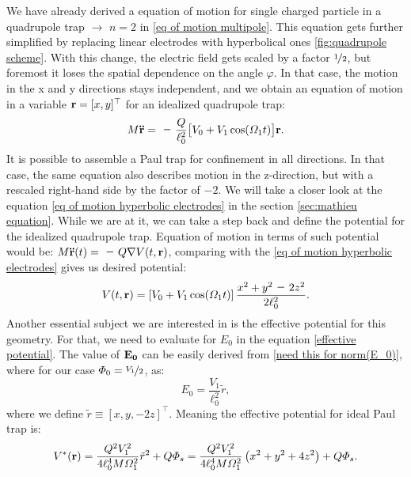 \label{sec:quadrupole trap}
We have already derived a equation of motion for single charged particle in a quadrupole trap $\rightarrow$ $n=2$ in \eqref{eq of motion multipole}. This equation gets further simplified by replacing linear electrodes with hyperbolical ones \ref{fig:quadrupole scheme}. With this change, the electric field gets scaled \cite{leefer2017investigation} by a factor $\nicefrac{1}{2}$, but foremost it loses the spatial dependence on the angle $\varphi$. In that case, the motion in the x and y directions stays independent, and we obtain an equation of motion in a variable $\vb{r} = [x,y]^\top$ for an idealized quadrupole trap:
\begin{equation}
	\label{eq of motion hyperbolic electrodes}
	M\vb{\ddot{r}} = \minus\dfrac{Q}{\ell_0^2} \big[V_0 + V_1 \cos(\Omega_1 t)\big] \vb{r}.
\end{equation}
It is possible to assemble a Paul trap for confinement in all directions. In that case, the same equation also describes motion in the z-direction, but with a rescaled right-hand side by the factor of $\minus 2$. We will take a closer look at the equation \eqref{eq of motion hyperbolic electrodes} in the section \ref{sec:mathieu equation}. While we are at it, we can take a step back and define the potential for the idealized quadrupole trap. Equation of motion in terms of such potential would be: $M\vb{\ddot{r}}(t) = \minus Q\nabla V(t,\vb{r})$, comparing with the \eqref{eq of motion hyperbolic electrodes} gives us desired potential:
\begin{equation}
	\label{ideal quadrupole potential}
	V(t,\vb{r}) = \left[V_0 + V_1 \cos(\Omega_1 t)\right] \dfrac{x^2+y^2 \minus 2z^2}{2\ell_0^2}.
\end{equation}
Another essential subject we are interested in is the effective potential for this geometry. For that, we need to evaluate for $E_0$ in the equation \eqref{effective potential}. The value of $\vb{E_0}$ can be easily derived from \eqref{need this for norm(E_0)}, where for our case $\Phi_0 = \nicefrac{V_1}{2}$, as:
\begin{equation}
	\label{norm(E_0)}
	E_0 = \dfrac{V_1}{\ell_0^2} \tilde{r},
\end{equation}
where we define $\tilde{r} \equiv \left[x, y, \minus 2 z\right]^\top$. Meaning the effective potential for ideal Paul trap is:
\begin{equation}
	\label{effective potential hyperbolic}
	V^*(\vb{r}) = \dfrac{Q^2 V_1^2}{4\ell_0^4 M \Omega_1^2} \tilde{r}^2 + Q\Phi_s = \dfrac{Q^2 V_1^2}{4\ell_0^4 M \Omega_1^2} \left(x^2 + y^2 + 4z^2\right) + Q\Phi_s.
\end{equation}

